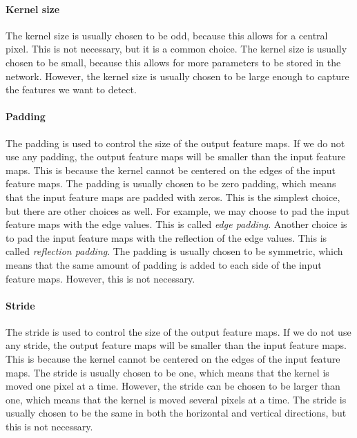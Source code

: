 
        \paragraph{Kernel size}
            The kernel size is usually chosen to be odd, because this allows for a central pixel. This is not necessary, but it is a common choice. The kernel size is usually chosen to be small, because this allows for more parameters to be stored in the network. However, the kernel size is usually chosen to be large enough to capture the features we want to detect.

        \paragraph{Padding}
            The padding is used to control the size of the output feature maps. If we do not use any padding, the output feature maps will be smaller than the input feature maps. This is because the kernel cannot be centered on the edges of the input feature maps. The padding is usually chosen to be zero padding, which means that the input feature maps are padded with zeros. This is the simplest choice, but there are other choices as well. For example, we may choose to pad the input feature maps with the edge values. This is called \textit{edge padding}. Another choice is to pad the input feature maps with the reflection of the edge values. This is called \textit{reflection padding}. The padding is usually chosen to be symmetric, which means that the same amount of padding is added to each side of the input feature maps. However, this is not necessary. 

        \paragraph{Stride}
            The stride is used to control the size of the output feature maps. If we do not use any stride, the output feature maps will be smaller than the input feature maps. This is because the kernel cannot be centered on the edges of the input feature maps. The stride is usually chosen to be one, which means that the kernel is moved one pixel at a time. However, the stride can be chosen to be larger than one, which means that the kernel is moved several pixels at a time. The stride is usually chosen to be the same in both the horizontal and vertical directions, but this is not necessary.

